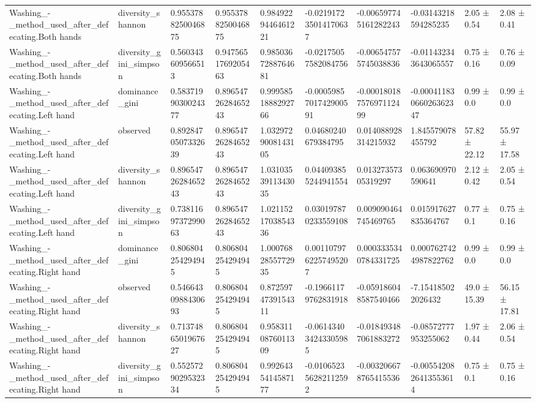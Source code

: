 \begin{longtable}{llllllllll}
Washing\_-\_method\_used\_after\_defecating.Both hands & diversity\_shannon & 0.9553788250046875 & 0.9553788250046875 & 0.9849229446461221 & -0.021917235014170637 & -0.006597745161282243 & -0.03143218594285235 & 2.05 ± 0.54 & 2.08 ± 0.41 \\
Washing\_-\_method\_used\_after\_defecating.Both hands & diversity\_gini\_simpson & 0.560343609566513 & 0.9475651769205463 & 0.9850367288764681 & -0.02175057582084756 & -0.006547575745038836 & -0.011432343643065557 & 0.75 ± 0.16 & 0.76 ± 0.09 \\
Washing\_-\_method\_used\_after\_defecating.Left hand & dominance\_gini & 0.5837199030024377 & 0.8965472628465243 & 0.9995851888292766 & -0.0005985701742900591 & -0.00018018757697112499 & -0.00041183066026362347 & 0.99 ± 0.0 & 0.99 ± 0.0 \\
Washing\_-\_method\_used\_after\_defecating.Left hand & observed & 0.8928470507332639 & 0.8965472628465243 & 1.0329729008143105 & 0.04680240679384795 & 0.014088928314215932 & 1.845579078455792 & 57.82 ± 22.12 & 55.97 ± 17.58 \\
Washing\_-\_method\_used\_after\_defecating.Left hand & diversity\_shannon & 0.8965472628465243 & 0.8965472628465243 & 1.0310353911343035 & 0.044093855244941554 & 0.01327357305319297 & 0.063690970590641 & 2.12 ± 0.42 & 2.05 ± 0.54 \\
Washing\_-\_method\_used\_after\_defecating.Left hand & diversity\_gini\_simpson & 0.7381169737299063 & 0.8965472628465243 & 1.0211521703854336 & 0.030197870233559108 & 0.009090464745469765 & 0.015917627835364767 & 0.77 ± 0.1 & 0.75 ± 0.16 \\
Washing\_-\_method\_used\_after\_defecating.Right hand & dominance\_gini & 0.806804254294945 & 0.806804254294945 & 1.0007682855772935 & 0.0011079762257495207 & 0.0003335340784331725 & 0.0007627424987822762 & 0.99 ± 0.0 & 0.99 ± 0.0 \\
Washing\_-\_method\_used\_after\_defecating.Right hand & observed & 0.5466430988430693 & 0.806804254294945 & 0.8725974739154311 & -0.19661179762831918 & -0.059186048587540466 & -7.154185022026432 & 49.0 ± 15.39 & 56.15 ± 17.81 \\
Washing\_-\_method\_used\_after\_defecating.Right hand & diversity\_shannon & 0.7137486501967627 & 0.806804254294945 & 0.9583110876011309 & -0.061434034243305985 & -0.018493487061883272 & -0.08572777953255062 & 1.97 ± 0.44 & 2.06 ± 0.54 \\
Washing\_-\_method\_used\_after\_defecating.Right hand & diversity\_gini\_simpson & 0.5525729029532334 & 0.806804254294945 & 0.9926435414587177 & -0.010652356282112592 & -0.003206678765415536 & -0.0055420826413553614 & 0.75 ± 0.1 & 0.75 ± 0.16 \\

\end{longtable}
